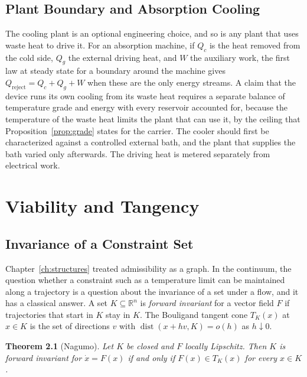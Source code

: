 \documentclass[11pt,openany]{book}
\theoremstyle{plain}
\newtheorem{theorem}{Theorem}[chapter]
\theoremstyle{definition}
\theoremstyle{remark}
\newcommand{\R}{\mathbb{R}}
\begin{document}
\section{Plant Boundary and Absorption Cooling}

The cooling plant is an optional engineering choice, and so is any plant that uses waste heat to drive it. For an absorption machine, if $Q_c$ is the heat removed from the cold side, $Q_g$ the external driving heat, and $W$ the auxiliary work, the first law at steady state for a boundary around the machine gives $Q_{\mathrm{reject}}=Q_c+Q_g+W$ when these are the only energy streams. A claim that the device runs its own cooling from its waste heat requires a separate balance of temperature grade and energy with every reservoir accounted for, because the temperature of the waste heat limits the plant that can use it, by the ceiling that Proposition~\ref{prop:grade} states for the carrier. The cooler should first be characterized against a controlled external bath, and the plant that supplies the bath varied only afterwards. The driving heat is metered separately from electrical work.

\chapter{Viability and Tangency}
\label{ch:viability}

\section{Invariance of a Constraint Set}

Chapter~\ref{ch:structures} treated admissibility as a graph. In the continuum, the question whether a constraint such as a temperature limit can be maintained along a trajectory is a question about the invariance of a set under a flow, and it has a classical answer. A set $K\subseteq\R^n$ is \emph{forward invariant} for a vector field $F$ if trajectories that start in $K$ stay in $K$. The Bouligand tangent cone $T_K(x)$ at $x\in K$ is the set of directions $v$ with $\operatorname{dist}(x+hv,K)=o(h)$ as $h\downarrow0$.

\begin{theorem}[Nagumo]
\label{thm:nagumo}
Let $K$ be closed and $F$ locally Lipschitz. Then $K$ is forward invariant for $\dot x=F(x)$ if and only if $F(x)\in T_K(x)$ for every $x\in K$.
\end{theorem}
\end{document}
